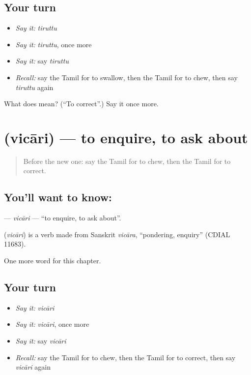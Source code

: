 \subsection*{Your turn}
\begin{itemize}
\raggedright
  \item \emph{Say it:} \emph{tiruttu}
  \item \emph{Say it:} \emph{tiruttu}, once more
  \item \emph{Say it:} say \emph{tiruttu}
  \item \emph{Recall:} say the Tamil for to swallow, then the Tamil for to chew, then say \emph{tiruttu} again
\end{itemize}

\begin{tcolorbox}[breakable,colback=teal!4,colframe=teal!35!black,title={Before you move on}]
What does  mean? (\textquotedblleft{}To correct\textquotedblright{}.) Say it once more.
\end{tcolorbox}
\section[\texorpdfstring{\ta{விசாரி} (vicāri)}{விசாரி (vicāri)}]{ (vicāri) — to enquire, to ask about}

\label{lesson:TA-C227-vicari}



\begin{quote}
Before the new one: say the Tamil for to chew, then the Tamil for to correct.
\end{quote}

\subsection*{You'll want to know: }
\textbf{} — \emph{vicāri} — \textquotedblleft{}to enquire, to ask about\textquotedblright{}.

\begin{cousinweb}
\textbf{} (\emph{vicāri}) is a verb made from Sanskrit \emph{vicāra}, \textquotedblleft{}pondering, enquiry\textquotedblright{} (CDIAL 11683).
\end{cousinweb}

\begin{grammarlens}[title={What you've built}]
One more word for this chapter.
\end{grammarlens}

\subsection*{Your turn}
\begin{itemize}
\raggedright
  \item \emph{Say it:} \emph{vicāri}
  \item \emph{Say it:} \emph{vicāri}, once more
  \item \emph{Say it:} say \emph{vicāri}
  \item \emph{Recall:} say the Tamil for to chew, then the Tamil for to correct, then say \emph{vicāri} again
\end{itemize}

